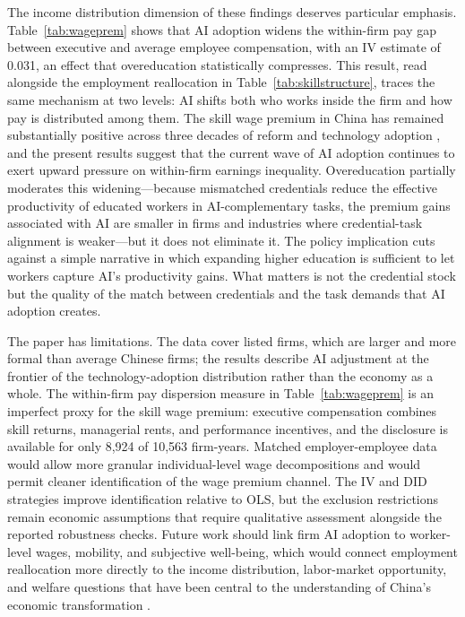\documentclass[12pt,a4paper]{article}
\theoremstyle{predstyle}
\theoremstyle{plain}
\begin{document}
The income distribution dimension of these findings deserves particular emphasis. Table~\ref{tab:wageprem} shows that AI adoption widens the within-firm pay gap between executive and average employee compensation, with an IV estimate of 0.031, an effect that overeducation statistically compresses. This result, read alongside the employment reallocation in Table~\ref{tab:skillstructure}, traces the same mechanism at two levels: AI shifts both who works inside the firm and how pay is distributed among them. The skill wage premium in China has remained substantially positive across three decades of reform and technology adoption \citep{knight2003, knight2014}, and the present results suggest that the current wave of AI adoption continues to exert upward pressure on within-firm earnings inequality. Overeducation partially moderates this widening---because mismatched credentials reduce the effective productivity of educated workers in AI-complementary tasks, the premium gains associated with AI are smaller in firms and industries where credential-task alignment is weaker---but it does not eliminate it. The policy implication cuts against a simple narrative in which expanding higher education is sufficient to let workers capture AI's productivity gains. What matters is not the credential stock but the quality of the match between credentials and the task demands that AI adoption creates.

The paper has limitations. The data cover listed firms, which are larger and more formal than average Chinese firms; the results describe AI adjustment at the frontier of the technology-adoption distribution rather than the economy as a whole. The within-firm pay dispersion measure in Table~\ref{tab:wageprem} is an imperfect proxy for the skill wage premium: executive compensation combines skill returns, managerial rents, and performance incentives, and the disclosure is available for only 8,924 of 10,563 firm-years. Matched employer-employee data would allow more granular individual-level wage decompositions and would permit cleaner identification of the wage premium channel. The IV and DID strategies improve identification relative to OLS, but the exclusion restrictions remain economic assumptions that require qualitative assessment alongside the reported robustness checks. Future work should link firm AI adoption to worker-level wages, mobility, and subjective well-being, which would connect employment reallocation more directly to the income distribution, labor-market opportunity, and welfare questions that have been central to the understanding of China's economic transformation \citep{knight2014}.
\end{document}
